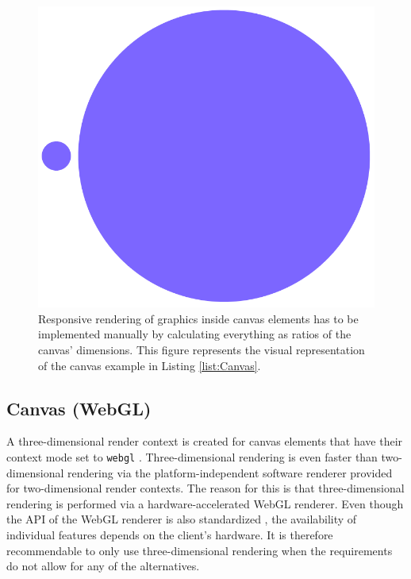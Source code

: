 \begin{figure}[tp]
\centering
\includegraphics[keepaspectratio,width=\linewidth,height=\fullh / 3]{images/canvas.png}
\caption[Canvas With Responsive Circles]{
  Responsive rendering of graphics inside canvas elements has to be implemented manually by calculating everything as ratios of the canvas' dimensions. 
  This figure represents the visual representation of the canvas example in Listing \ref{list:Canvas}. 
}
\label{fig:Canvas}
\end{figure}

\subsection{Canvas (WebGL)}

A three-dimensional render context is created for canvas elements that have their context mode set to \lstinline{webgl} .
Three-dimensional rendering is even faster than two-dimensional rendering via the platform-independent software renderer provided for two-dimensional render contexts.
The reason for this is that three-dimensional rendering is performed via a hardware-accelerated WebGL renderer.
Even though the API of the WebGL renderer is also standardized \parencite{WebGL}, the availability of individual features depends on the client's hardware.
It is therefore recommendable to only use three-dimensional rendering when the requirements do not allow for any of the alternatives.

